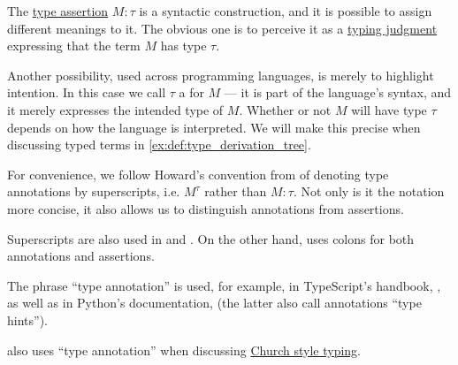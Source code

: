 \begin{concept}\label{con:type_annotation}
  The \hyperref[def:type_assertion]{type assertion} \( M: \tau \) is a syntactic construction, and it is possible to assign different meanings to it. The obvious one is to perceive it as a \hyperref[rem:typing_judgments]{typing judgment} expressing that the term \( M \) has type \( \tau \).

  Another possibility, used across programming languages, is merely to highlight intention. In this case we call \( \tau \) a  for \( M \) --- it is part of the language's syntax, and it merely expresses the intended type of \( M \). Whether or not \( M \) will have type \( \tau \) depends on how the language is interpreted. We will make this precise when discussing typed terms in \cref{ex:def:type_derivation_tree}.

  For convenience, we follow Howard's convention from \cite{Howard1980FormulasAsTypes} of denoting type annotations by superscripts, i.e. \( M^\tau \) rather than \( M: \tau \). Not only is it the notation more concise, it also allows us to distinguish annotations from assertions.
\end{concept}
\begin{comments}
  \item Superscripts are also used in \cite{Mimram2020ProgramEqualsProof} and \cite[ch. 5]{Hindley1997BasicSTT}. On the other hand,  uses colons for both annotations and assertions.

  \item The phrase \enquote{type annotation} is used, for example, in TypeScript's handbook, \cite{TypeScriptDocs:5.7:handbook}, as well as in Python's documentation, \cite{PythonDocs:3.13:typing} (the latter also call annotations \enquote{type hints}).

   also uses \enquote{type annotation} when discussing \hyperref[rem:typing_style]{Church style typing}.
\end{comments}

